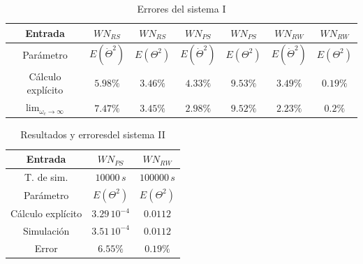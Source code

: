 \documentclass[a4paper,11pt,twoside]{IT-CNEA}
\begin{document}
\begin{table}[h!]
\centering
\caption{Errores del sistema I}
\label{tabla:ErroresSistI}
\begin{tabular}{|c|c|c|c|c|c|c|}
\hline
Entrada  & $WN_{RS}$ & $WN_{RS}$& $WN_{PS}$& $WN_{PS}$& $WN_{RW}$&$WN_{RW}$\\ \hline
Parámetro & $E\left( \dot{\Theta}^2 \right)$ & $E\left( \Theta^2\right)$& $E\left( \dot{\Theta}^2 \right)$ & $E\left( \Theta^2\right)$& $E\left( \dot{\Theta}^2 \right)$ & $E\left( \Theta^2\right)$  \\ \hline
Cálculo explícito&$5.98\%$&$3.46\%$&$4.33\%$&$9.53\%$&$3.49\%$&$0.19\%$ \\ \hline
$\lim_{\omega_c\to\infty}$&$7.47\%$&$3.45\%$&$2.98\%$&$9.52\%$&$2.23\%$&$0.2\%$\\ \hline
\end{tabular}
\end{table}
\begin{table}[h!]
\centering
\caption{Resultados y erroresdel sistema II}
\label{tabla:ResultadosSistII}
\begin{tabular}{|c|c|c|}
\hline
Entrada  &  $WN_{PS}$& $WN_{RW}$\\ \hline
T. de sim.&$10000\,s$&$100000\,s$ \\ \hline
Parámetro & $E\left( \Theta^2 \right)$ & $E\left( \Theta^2\right)$\\ \hline
Cálculo explícito&$3.29\,10^{-4}$&$0.0112$\\ \hline
Simulación&$3.51\,10^{-4}$&$0.0112$\\ \hline
Error &$6.55\%$&$0.19\%$ \\ \hline
\end{tabular}
\end{table}

\newpage
\end{document}
